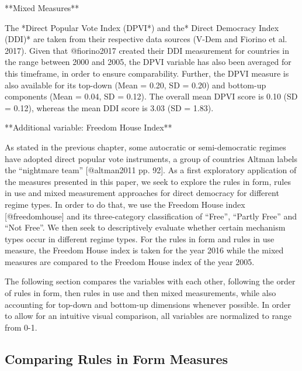 \documentclass{systats}
\begin{document}
**Mixed Measures**

The *Direct Popular Vote Index (DPVI*) and the* Direct Democracy Index (DDI)* are taken from their respective data sources (V-Dem and Fiorino et al. 2017). Given that @fiorino2017 created their DDI measurement for countries in the range between 2000 and 2005, the DPVI variable has also been averaged for this timeframe, in order to ensure comparability. Further, the DPVI measure is also available for its top-down (Mean = 0.20, SD = 0.20) and bottom-up components (Mean = 0.04, SD = 0.12). The overall mean DPVI score is 0.10 (SD = 0.12), whereas the mean DDI score is 3.03 (SD = 1.83). 

**Additional variable: Freedom House Index**

As stated in the previous chapter, some autocratic or semi-democratic regimes have adopted direct popular vote instruments, a group of countries Altman labels the “nightmare team” [@altman2011 pp. 92]. As a first exploratory application of the measures presented in this paper, we seek to explore the rules in form, rules in use and mixed measurement approaches for direct democracy for different regime types. In order to do that, we use the Freedom House index [@freedomhouse] and its three-category classification of “Free”, “Partly Free” and “Not Free”. We then seek to descriptively evaluate whether certain mechanism types occur in different regime types. For the rules in form and rules in use measure, the Freedom House index is taken for the year 2016 while the mixed measures are compared to the Freedom House index of the year 2005.

The following section compares the variables with each other, following the order of rules in form, then rules in use and then mixed measurements, while also accounting for top-down and bottom-up dimensions whenever possible. In order to allow for an intuitive visual comparison, all variables are normalized to range from 0-1.





\subsection{Comparing Rules in Form Measures}
\end{document}
